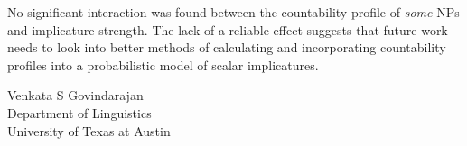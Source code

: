 \documentclass[10pt, biblatex, linguex]{report}
\begin{document}
No significant interaction was found between the countability profile of
\textit{some}-NPs and implicature strength. The lack of a reliable effect
suggests that future work needs to look into better
methods of calculating and incorporating countability profiles into a
probabilistic model of scalar implicatures.

\begin{addresses}
  \begin{address}
    Venkata S Govindarajan \\
    Department of Linguistics \\
    University of Texas at Austin \\
  \end{address}
\end{addresses}


\newpage

\pagestyle{empty}
\printbibliography[title={references}]
\end{document}
